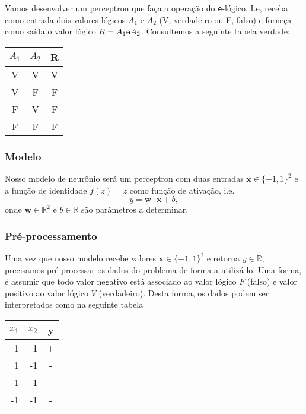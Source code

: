 Vamos desenvolver um perceptron que faça a operação do \verb+e+-lógico. I.e, receba como entrada dois valores lógicos $A_1$ e $A_2$ (V, verdadeiro ou F, falso) e forneça como saída o valor lógico $R = A_1 \verb+e+ A_2$. Consultemos a seguinte tabela verdade:

\begin{center}
  \begin{tabular}{cc|c}
    $A_1$ & $A_2$ & R\\\hline
    V & V & V\\
    V & F & F\\
    F & V & F\\
    F & F & F\\\hline
  \end{tabular}
\end{center}


\subsubsection{Modelo}

Nosso modelo de neurônio será um perceptron com duas entradas $\pmb{x}\in \{-1,1\}^2$ e a função de identidade $f(z)=z$ como função de ativação, i.e.
\begin{equation}
  y = \pmb{w}\cdot\pmb{x} + b,
\end{equation}
onde $\pmb{w}\in\mathbb{R}^2$ e $b\in\mathbb{R}$ são parâmetros a determinar.


\subsubsection{Pré-processamento}

Uma vez que nosso modelo recebe valores $\pmb{x}\in \{-1,1\}^2$ e retorna $y\in\mathbb{R}$, precisamos pré-processar os dados do problema de forma a utilizá-lo. Uma forma, é assumir que todo valor negativo está associado ao valor lógico $F$ (falso) e valor positivo ao valor lógico $V$ (verdadeiro). Desta forma, os dados podem ser interpretados como na seguinte tabela

\begin{center}
  \begin{tabular}{rr|c}
    $x_1$ & $x_2$ & y\\\hline
    1 & 1 & +\\
    1 & -1 & -\\
    -1 & 1 & -\\
    -1 & -1 & -\\\hline
  \end{tabular}
\end{center}
    
